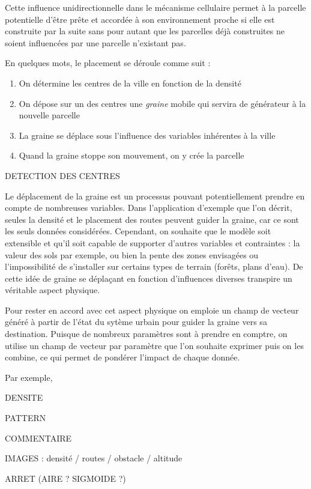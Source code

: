 \documentclass[12pt]{article}
\begin{document}
Cette influence unidirectionnelle dans le mécanisme cellulaire permet
à la parcelle potentielle d'être prête et accordée à son environnement
proche si elle est construite par la suite sans pour autant que les
parcelles déjà construites ne soient influencées par une parcelle
n'existant pas.

En quelques mots, le placement se déroule comme suit :

\begin{enumerate}
\item{On détermine les centres de la ville en fonction de la densité}
\item{On dépose sur un des centres une \textit{graine} mobile qui
  servira de générateur à la nouvelle parcelle}
\item{La graine se déplace sous l'influence des variables inhérentes à
  la ville}
\item{Quand la graine stoppe son mouvement, on y crée la parcelle}
\end{enumerate}

DETECTION DES CENTRES

Le déplacement de la graine est un processus pouvant potentiellement
prendre en compte de nombreuses variables. Dans l'application
d'exemple que l'on décrit, seules la densité et le placement des
routes peuvent guider la graine, car ce sont les seuls données
considérées. Cependant, on souhaite que le modèle soit extensible et
qu'il soit capable de supporter d'autres variables et contraintes : la
valeur des sols par exemple, ou bien la pente des zones envisagées ou
l'impossibilité de s'installer sur certains types de terrain (forêts,
plans d'eau). De cette idée de graine se déplaçant en fonction
d'influences diverses transpire un véritable aspect physique.

Pour rester en accord avec cet aspect physique on emploie un champ de
vecteur généré à partir de l'état du sytème urbain pour guider la
graine vers sa destination. Puisque de nombreux paramètres sont à
prendre en comptre, on utilise un champ de vecteur par paramètre que
l'on souhaite exprimer puis on les combine, ce qui permet de pondérer
l'impact de chaque donnée.

Par exemple,

DENSITE

PATTERN

COMMENTAIRE

IMAGES : densité / routes / obstacle / altitude

ARRET (AIRE ? SIGMOIDE ?)
\end{document}
